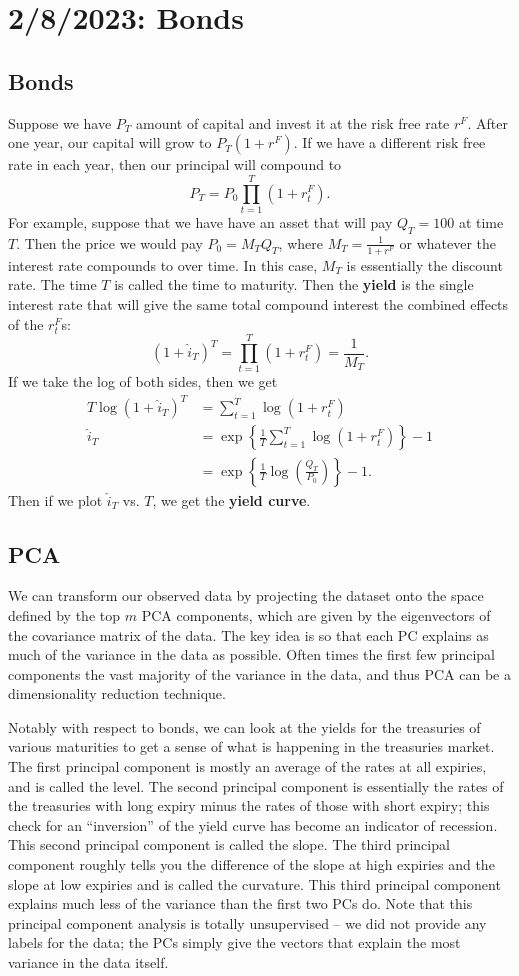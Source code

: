 \chapter{2/8/2023: Bonds}
\section{Bonds}
Suppose we have $P_T$ amount of capital and invest it at the risk free rate $r^F$. After one year, our capital will grow to $P_T(1+r^F)$. If we have a different risk free rate in each year, then our principal will compound to $$ P_T = P_0\prod_{t=1}^T(1+r_t^F). $$ For example, suppose that we have have an asset that will pay $Q_T=100$ at time $T$. Then the price we would pay $P_0=M_TQ_T$, where $M_T=\frac{1}{1+r^F}$ or whatever the interest rate compounds to over time. In this case, $M_T$ is essentially the discount rate. The time $T$ is called the time to maturity. Then the \textbf{yield} is the single interest rate that will give the same total compound interest the combined effects of the $r_t^F$s: $$ (1+\hat i_T)^T = \prod_{t=1}^T(1+r_t^F) = \frac{1}{M_T}. $$ If we take the log of both sides, then we get \begin{align*}
	T\log(1+\hat i_T)^T &= \sum_{t=1}^T\log(1+r_t^F) \\
	\hat i_T &= \exp\left\{\frac{1}{T}\sum_{t=1}^T\log(1+r_t^F)\right\} - 1 \\
		&= \exp\left\{\frac{1}{T}\log\left(\frac{Q_T}{P_0}\right)\right\}-1.
\end{align*} Then if we plot $\hat i_T$ vs. $T$, we get the \textbf{yield curve}.

\section{PCA}
We can transform our observed data by projecting the dataset onto the space defined by the top $m$ PCA components, which are given by the eigenvectors of the covariance matrix of the data. The key idea is so that each PC explains as much of the variance in the data as possible. Often times the first few principal components the vast majority of the variance in the data, and thus PCA can be a dimensionality reduction technique.

Notably with respect to bonds, we can look at the yields for the treasuries of various maturities to get a sense of what is happening in the treasuries market. The first principal component is mostly an average of the rates at all expiries, and is called the level. The second principal component is essentially the rates of the treasuries with long expiry minus the rates of those with short expiry; this check for an ``inversion'' of the yield curve has become an indicator of recession. This second principal component is called the slope. The third principal component roughly tells you the difference of the slope at high expiries and the slope at low expiries and is called the curvature. This third principal component explains much less of the variance than the first two PCs do. Note that this principal component analysis is totally unsupervised -- we did not provide any labels for the data; the PCs simply give the vectors that explain the most variance in the data itself.

